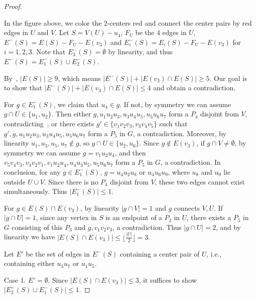 \documentclass[a4paper]{article}
\newcommand{\emphd}[1]{{\fontseries{b}\selectfont\textsf{#1}}}
\begin{document}
\begin{proof}
\begin{figure}[h]
\end{figure}

	In the figure above, we color the 2-centers red and connect the center pairs by red edges in $U$ and $V$. Let $S=V(U)-u_4$, $F_U$ be the 4 edges in $U$, $E^-(S) =E(S)-F_U-E(v_3)$ and $E_i^-(S) = E_i(S)-F_U-E(v_3)$ for $i=1,2,3$. Note that $E_3^-(S)=\emptyset$ by linearity, and thus $E^-(S) = E_1^-(S)\cup E_2^-(S)$. 
    
    By~, $|E(S)|\ge 9$, which means $|E^-(S)|+|E(v_3)\cap E(S)|\ge 5$. Our goal is to show that $|E^-(S)|+|E(v_3)\cap E(S)|\leq 4$ and obtain a contradiction. 

    For $g\in E_1^-(S)$, we claim that $u_4\in g$. If not, by symmetry we can assume $g\cap U\in\{u_1,u_2\}$. Then either $g,u_1u_2u_3,u_3u_4u_5,u_5u_6u_7$ form a $P_4$ disjoint from $V$, contradicting~,
    or there exists $g'\in\{v_1v_2v_3,v_3v_4v_5\}$ such that $g',g,u_1u_2u_3,u_3u_4u_5,u_5u_6u_7$ form a $P_5$ in $G$, a contradiction. Moreover, by linearity $u_1,u_3,u_5,u_7\notin g$, so $g\cap U\in \{u_2,u_6\}$. Since $g\notin E(v_3)$, if $g\cap V\neq \emptyset$, by symmetry we can assume $g=v_1u_2u_4$, 
    and then $v_5v_4v_3,v_3v_2v_1,v_1u_2u_4,u_4u_3u_5,u_5u_6u_7$ form a $P_5$ in $G$, a contradiction. In conclusion, for any $g\in E_1^-(S)$, $g=u_4u_2u_8$ or $u_4u_6u_9$, where $u_8$ and $u_9$ lie outside $U\cup V$. Since there is no $P_4$ disjoint from $V$, these two edges cannot exist simultaneously. Thus $|E_1^-(S)|\le 1$.

    For $g\in E(S)\cap E(v_3)$, by linearity $|g\cap V|=1$ and $g$ connects $V,U$. If $|g\cap U|=1$, since any vertex in $S$ is an endpoint of a $P_3$ in $U$, there exists a $P_5$ in $G$ consisting of this $P_3$ and $g, v_1v_2v_3$, a contradiction. Thus $|g\cap U|=2$, and by linearity we have $|E(S)\cap E(v_3)|\le \lfloor\frac{|U|}{2}\rfloor=3$.

     Let $E'$ be the set of edges in $E^-(S)$ containing a center pair of $U$, i.e., containing either $u_3u_7$ or $u_1u_5$.
    
    \emphd{Case 1.} $E'=\emptyset$. Since $|E(S)\cap E(v_3)|\le 3$, it suffices to show $|E_2^-(S)\cup E_1^-(S)|\le 1$.
    

\end{proof}
\end{document}

